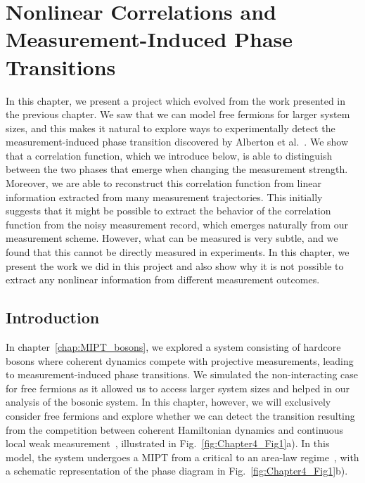 \chapter{Nonlinear Correlations and Measurement-Induced Phase Transitions}
\thispagestyle{empty}
\label{chap:MIPT_continuous_measurement}

In this chapter, we present a project which evolved from the work presented in the previous chapter. We saw that we can model free fermions for larger system sizes, and this makes it natural to explore ways to experimentally detect the measurement-induced phase transition discovered by Alberton et al.~\cite{alberton2021}. We show that a correlation function, which we introduce below, is able to distinguish between the two phases that emerge when changing the measurement strength. Moreover, we are able to reconstruct this correlation function from linear information extracted from many measurement trajectories. This initially suggests that it might be possible to extract the behavior of the correlation function from the noisy measurement record, which emerges naturally from our measurement scheme. However, what can be measured is very subtle, and we found that this cannot be directly measured in experiments. In this chapter, we present the work we did in this project and also show why it is not possible to extract any nonlinear information from different measurement outcomes.

\section{Introduction}

In chapter~\ref{chap:MIPT_bosons}, we explored a system consisting of hardcore bosons where coherent dynamics compete with projective measurements, leading to measurement-induced phase transitions. We simulated the non-interacting case for free fermions as it allowed us to access larger system sizes and helped in our analysis of the bosonic system. In this chapter, however, we will exclusively consider free fermions and explore whether we can detect the transition resulting from the competition between coherent Hamiltonian dynamics and continuous local weak measurement~\cite{szyniszewski2019,romito2020}, illustrated in Fig.~\ref{fig:Chapter4_Fig1}a). In this model, the system undergoes a MIPT from a critical to an area-law regime~\cite{alberton2021}, with a schematic representation of the phase diagram in Fig.~\ref{fig:Chapter4_Fig1}b).


